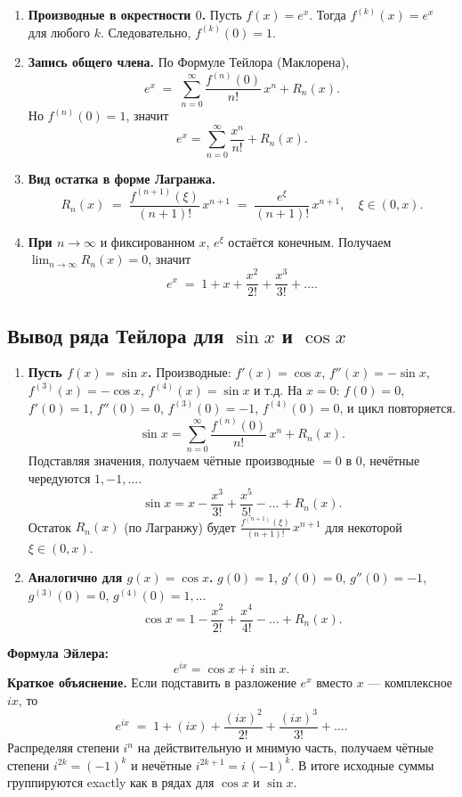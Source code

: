 \begin{enumerate}
  \item \textbf{Производные в окрестности $0$.}  
  Пусть $f(x)=e^x$. Тогда $f^{(k)}(x)=e^x$ для любого $k$. Следовательно, $f^{(k)}(0)=1$.
  \item \textbf{Запись общего члена.}  
  По Формуле Тейлора (Маклорена),
  \[
    e^x \;=\; \sum_{n=0}^{\infty}\frac{f^{(n)}(0)}{n!}\,x^n + R_n(x).
  \]
  Но $f^{(n)}(0)=1$, значит
  \[
    e^x = \sum_{n=0}^{\infty}\frac{x^n}{n!} + R_n(x).
  \]
  \item \textbf{Вид остатка в форме Лагранжа.}  
  \[
    R_n(x) \;=\; \frac{f^{(n+1)}(\xi)}{(n+1)!}\,x^{n+1} \;=\;\frac{e^\xi}{(n+1)!}\,x^{n+1},\quad \xi \in (0,x).
  \]
  \item \textbf{При $n\to \infty$} и фиксированном $x$, $e^\xi$ остаётся конечным. Получаем
  \(\lim_{n\to\infty} R_n(x)=0\), значит
  \[
    e^x \;=\; 1 + x + \frac{x^2}{2!} + \frac{x^3}{3!} + \dots .
  \]
\end{enumerate}

\medskip

\subsection*{Вывод ряда Тейлора для $\sin x$ и $\cos x$}

\begin{enumerate}
  \item \textbf{Пусть $f(x)=\sin x$.}  
  Производные: $f'(x)=\cos x$, $f''(x)=-\sin x$, $f^{(3)}(x)=-\cos x$, $f^{(4)}(x)=\sin x$ и т.д.  
  На $x=0$: $f(0)=0$, $f'(0)=1$, $f''(0)=0$, $f^{(3)}(0)=-1$, $f^{(4)}(0)=0$, и цикл повторяется.  
  \[
    \sin x = \sum_{n=0}^{\infty}\frac{f^{(n)}(0)}{n!}\,x^n + R_n(x).
  \]
  Подставляя значения, получаем чётные производные $=0$ в $0$, нечётные чередуются $1,-1,\dots$.
  \[
    \sin x = x - \frac{x^3}{3!} + \frac{x^5}{5!} - \dots + R_n(x).
  \]
  Остаток $R_n(x)$ (по Лагранжу) будет
  \(\frac{f^{(n+1)}(\xi)}{(n+1)!}\,x^{n+1}\) для некоторой \(\xi\in(0,x)\).

  \item \textbf{Аналогично для $g(x)=\cos x$.}  
  $g(0)=1$, $g'(0)=0$, $g''(0)=-1$, $g^{(3)}(0)=0$, $g^{(4)}(0)=1,\dots$  
  \[
    \cos x = 1 - \frac{x^2}{2!} + \frac{x^4}{4!} - \dots + R_n(x).
  \]
\end{enumerate}

\medskip


\textbf{Формула Эйлера:}  
\[
e^{i x} = \cos x + i\,\sin x.
\]
\textbf{Краткое объяснение.}  
Если подставить в разложение $e^x$ вместо $x$ — комплексное $i x$, то
\[
e^{ix} \;=\; 1 + (ix) + \frac{(ix)^2}{2!} + \frac{(ix)^3}{3!} + \dots .
\]
Распределяя степени $i^n$ на действительную и мнимую часть, получаем чётные степени $i^{2k}=(-1)^k$ и нечётные $i^{2k+1}=i\,(-1)^k$. В итоге исходные суммы группируются exactly как в рядах для $\cos x$ и $\sin x$.

